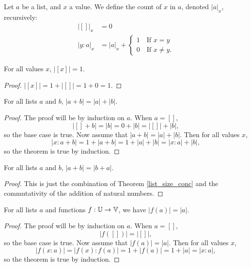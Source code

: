 \documentclass[../../math.tex]{subfiles}
\begin{document}
\begin{definition}
    Let $a$ be a list, and $x$ a value.  We define the count of $x$ in $a$,
    denoted $|a|_x$, recursively:
    \begin{align*}
           |[]|_x &= 0 \\
        |y : a|_x &= |a|_x + \begin{cases}
            1 \quad \text{If $x = y$} \\
            0 \quad \text{If $x \neq y$}.
        \end{cases}
    \end{align*}
\end{definition}

\begin{theorem}
    For all values $x$, $|[x]| = 1$.
\end{theorem}
\begin{proof}
    $|[x]| = 1 + |[]| = 1 + 0 = 1$.
\end{proof}

\begin{theorem} \label{list_size_conc}
    For all lists $a$ and $b$, $|a + b| = |a| + |b|$.
\end{theorem}
\begin{proof}
    The proof will be by induction on $a$.  When $a = []$,
    \[
        |[] + b| = |b| = 0 + |b| = |[]| + |b|,
    \]
    so the base case is true.  Now assume that $|a + b| = |a| + |b|$.  Then for
    all values $x$,
    \[
        |x : a + b| = 1 + |a + b| = 1 + |a| + |b| = |x : a| + |b|,
    \]
    so the theorem is true by induction.
\end{proof}

\begin{theorem} \label{list_size_comm}
    For all lists $a$ and $b$, $|a + b| = |b + a|$.
\end{theorem}
\begin{proof}
    This is just the combination of Theorem \ref{list_size_conc} and the
    commutativity of the addition of natural numbers.
\end{proof}

\begin{theorem} \label{list_image_size}
    For all lists $a$ and functions $f : \mathbb{U} \to \mathbb{V}$, we have $|f(a)| = |a|$.
\end{theorem}
\begin{proof}
    The proof will be by induction on $a$.  When $a = []$,
    \[
        |f([])| = |[]|,
    \]
    so the base case is true.  Now assume that $|f(a)| = |a|$.  Then for all
    values $x$,
    \[
        |f(x : a)| = |f(x) : f(a)| = 1 + |f(a)| = 1 + |a| = |x : a|,
    \]
    so the theorem is true by induction.
\end{proof}
\end{document}
